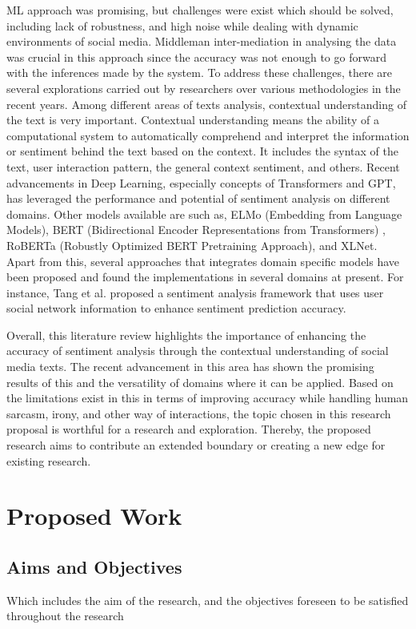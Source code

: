 \documentclass[a4paper,onecolumn,11pt]{article}
\begin{document}
ML approach was promising, but challenges were exist which should be solved, including lack of robustness, and high noise while dealing with dynamic environments of social media. Middleman inter-mediation in analysing the data was crucial in this approach since the accuracy was not enough to go forward with the inferences made by the system. To address these challenges, there are several explorations carried out by researchers over various methodologies in the recent years. Among different areas of texts analysis, contextual understanding of the text is very important. Contextual understanding means the ability of a computational system to automatically comprehend and interpret the information or sentiment behind the text based on the context.  It includes the syntax of the text, user interaction pattern, the general context sentiment, and others. Recent advancements in Deep Learning, especially concepts of Transformers and GPT, has leveraged the performance and potential of sentiment analysis on different domains.  Other models available are such as, ELMo (Embedding from Language Models)\cite{ilic2018deep}, BERT (Bidirectional Encoder Representations from Transformers) \cite{devlin2018bert}, RoBERTa (Robustly Optimized BERT Pretraining Approach)\cite{liu2019roberta}, and XLNet\cite{yang2019xlnet}. Apart from this, several approaches that integrates domain specific models have been proposed and found the implementations in several domains at present.  For instance, Tang et al. proposed a sentiment analysis framework \cite{tang2015effective} that uses user social network information to enhance sentiment prediction accuracy. 


Overall, this literature review highlights the importance of enhancing the accuracy of sentiment analysis through the contextual understanding of social media texts. The recent advancement in this area has shown the promising results of this and the versatility of domains where it can be applied. Based on the limitations exist in this in terms of improving accuracy while handling human sarcasm, irony, and other way of interactions, the topic chosen in this research proposal is worthful for a research and exploration. Thereby, the proposed research aims to contribute an extended boundary or creating a new edge for existing research.


\section{Proposed Work}
\subsection{Aims and Objectives}
Which includes the aim of the research, and the objectives foreseen to be satisfied throughout the research
\end{document}
